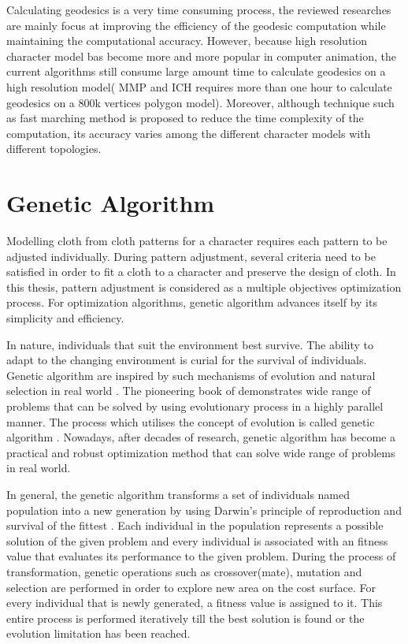 Calculating geodesics is a very time consuming process, the reviewed researches are mainly focus at improving the efficiency of the geodesic computation while maintaining the computational accuracy. However, because high resolution character model bas become more and more popular in computer animation, the current algorithms still consume large amount time to calculate geodesics on a high resolution model( MMP and ICH requires more than one hour to calculate geodesics on a 800k vertices polygon model). Moreover, although technique such as fast marching method is proposed to reduce the time complexity of the computation, its accuracy varies among the different character models with different topologies.


\section{Genetic Algorithm}

Modelling cloth from cloth patterns for a character requires each pattern to be adjusted individually.  During pattern adjustment, several criteria need to be satisfied in order to fit a cloth to a character and preserve the design of cloth. In this thesis, pattern adjustment is considered as a multiple objectives optimization process. For optimization algorithms, genetic algorithm advances itself by its simplicity and efficiency.

In nature, individuals that suit the environment best survive. The ability to adapt to the changing environment is curial for the survival of individuals. Genetic algorithm are inspired by such mechanisms of evolution and natural selection in real world . The pioneering book of  demonstrates wide range of problems that can be solved by using evolutionary process in a highly parallel manner. The process which utilises the concept of evolution is called genetic algorithm . Nowadays, after decades of research, genetic algorithm has become a practical and robust optimization method that can solve wide range of problems in real world.

In general, the genetic algorithm transforms a set of individuals named population into a new generation by using Darwin's principle of reproduction and survival of the fittest . Each individual in the population represents a possible solution of the given problem and every individual is associated with an fitness value that evaluates its performance to the given problem. During the process of transformation, genetic operations such as crossover(mate), mutation and selection are performed in order to explore new area on the cost surface. For every individual that is newly generated, a fitness value is assigned to it. This entire process is performed iteratively till the best solution is found or the evolution limitation has been reached. 

